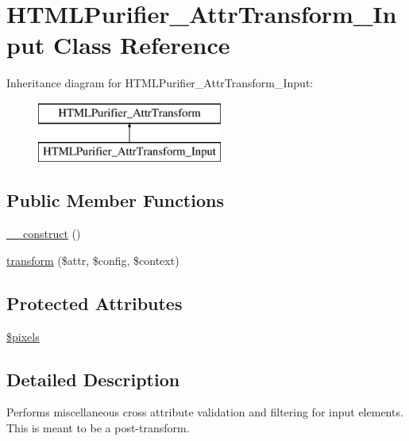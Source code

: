 \hypertarget{classHTMLPurifier__AttrTransform__Input}{\section{H\+T\+M\+L\+Purifier\+\_\+\+Attr\+Transform\+\_\+\+Input Class Reference}
\label{classHTMLPurifier__AttrTransform__Input}
}
Inheritance diagram for H\+T\+M\+L\+Purifier\+\_\+\+Attr\+Transform\+\_\+\+Input\+:\begin{figure}[H]
\begin{center}
\leavevmode
\includegraphics[height=2.000000cm]{classHTMLPurifier__AttrTransform__Input}
\end{center}
\end{figure}
\subsection*{Public Member Functions}
\begin{DoxyCompactItemize}
\item 
\hyperlink{classHTMLPurifier__AttrTransform__Input_aa91287c0dfd011b6d88ccd7aa95d94dd}{\+\_\+\+\_\+construct} ()
\item 
\hyperlink{classHTMLPurifier__AttrTransform__Input_a1c4d242ce1ef3e35ea32735cd8c039bd}{transform} (\$attr, \$config, \$context)
\end{DoxyCompactItemize}
\subsection*{Protected Attributes}
\begin{DoxyCompactItemize}
\item 
\hyperlink{classHTMLPurifier__AttrTransform__Input_a78d319c585f2108dcda04bd664788f8e}{\$pixels}
\end{DoxyCompactItemize}


\subsection{Detailed Description}
Performs miscellaneous cross attribute validation and filtering for input elements. This is meant to be a post-\/transform. 

